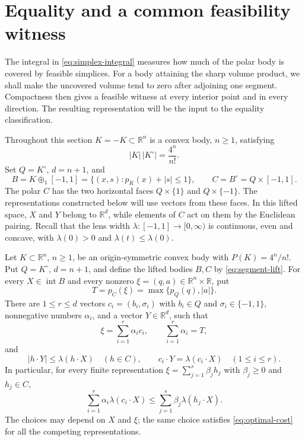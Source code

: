 \section{Equality and a common feasibility witness}
\label{sec:zero-deficit}

The integral in \eqref{eq:simplex-integral} measures how much of the polar body is covered by feasible simplices. For a body attaining the sharp volume product, we shall make the uncovered volume tend to zero after adjoining one segment. Compactness then gives a feasible witness at every interior point and in every direction. The resulting representation will be the input to the equality classification.

Throughout this section $K=-K\subset\mathbb{R}^n$ is a convex body, $n\ge1$, satisfying
\[
 |K|\,|K^\circ|=\frac{4^n}{n!}.
\]
Set $Q=K^\circ$, $d=n+1$, and
\begin{equation}\label{eq:segment-lift}
 B=K\oplus_1[-1,1]
   =\{(x,s):p_K(x)+|s|\le1\},
 \qquad C=B^\circ=Q\times[-1,1].
\end{equation}
The polar $C$ has the two horizontal faces $Q\times\{1\}$ and $Q\times\{-1\}$. The representations constructed below will use vectors from these faces. In this lifted space, $X$ and $Y$ belong to $\mathbb{R}^d$, while elements of $C$ act on them by the Euclidean pairing. Recall that the lens width $\lambda:[-1,1]\to[0,\infty)$ is continuous, even and concave, with $\lambda(0)>0$ and $\lambda(t)\le\lambda(0)$.

\begin{proposition}
\label{prop:optimal-representation}
Let $K\subset\mathbb{R}^n$, $n\ge1$, be an origin-symmetric convex body with $P(K)=4^n/n!$. Put $Q=K^\circ$, $d=n+1$, and define the lifted bodies $B,C$ by \eqref{eq:segment-lift}. For every $X\in\operatorname{int}B$ and every nonzero $\xi=(q,a)\in\mathbb{R}^n\times\mathbb{R}$, put
\[
 T=p_C(\xi)=\max\{p_Q(q),|a|\}.
\]
There are $1\le r\le d$ vectors $c_i=(b_i,\sigma_i)$ with $b_i\in Q$ and $\sigma_i\in\{-1,1\}$, nonnegative numbers $\alpha_i$, and a vector $Y\in\mathbb{R}^d$, such that
\begin{equation}\label{eq:optimal-representation}
 \xi=\sum_{i=1}^r\alpha_i c_i,
 \qquad \sum_{i=1}^r\alpha_i=T,
\end{equation}
and
\begin{equation}\label{eq:common-witness}
 |h\cdot Y|\le\lambda(h\cdot X)\quad(h\in C),
 \qquad
 c_i\cdot Y=\lambda(c_i\cdot X)\quad(1\le i\le r).
\end{equation}
In particular, for every finite representation $\xi=\sum_{j=1}^s\beta_jh_j$ with $\beta_j\ge0$ and $h_j\in C$,
\begin{equation}\label{eq:optimal-cost}
 \sum_{i=1}^r\alpha_i\lambda(c_i\cdot X)
 \le \sum_{j=1}^s\beta_j\lambda(h_j\cdot X).
\end{equation}
The choices may depend on $X$ and $\xi$; the same choice satisfies \eqref{eq:optimal-cost} for all the competing representations.
\end{proposition}

